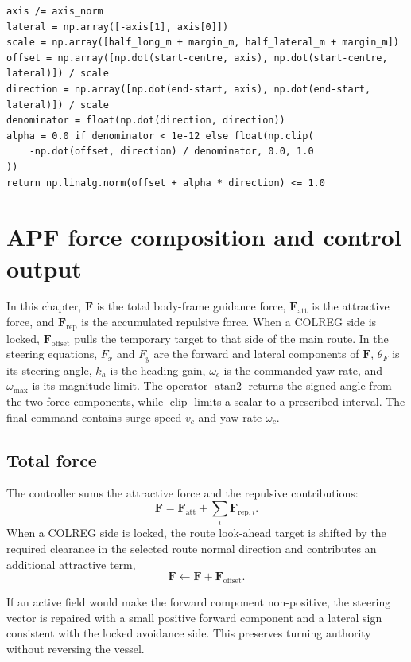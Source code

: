 \documentclass[11pt,a4paper]{article}
\begin{document}
\begin{lstlisting}
axis /= axis_norm
lateral = np.array([-axis[1], axis[0]])
scale = np.array([half_long_m + margin_m, half_lateral_m + margin_m])
offset = np.array([np.dot(start-centre, axis), np.dot(start-centre, lateral)]) / scale
direction = np.array([np.dot(end-start, axis), np.dot(end-start, lateral)]) / scale
denominator = float(np.dot(direction, direction))
alpha = 0.0 if denominator < 1e-12 else float(np.clip(
    -np.dot(offset, direction) / denominator, 0.0, 1.0
))
return np.linalg.norm(offset + alpha * direction) <= 1.0
\end{lstlisting}

\section{APF force composition and control output}

In this chapter, $\bm{F}$ is the total body-frame guidance force,
$\bm{F}_{\mathrm{att}}$ is the attractive force, and
$\bm{F}_{\mathrm{rep}}$ is the accumulated repulsive force. When a COLREG
side is locked, $\bm{F}_{\mathrm{offset}}$ pulls the temporary target to that
side of the main route. In the steering equations,
$F_x$ and $F_y$ are the forward and lateral components of $\bm{F}$,
$\theta_F$ is its steering angle, $k_h$ is the heading gain, $\omega_c$ is
the commanded yaw rate, and $\omega_{\max}$ is its magnitude limit. The
operator $\operatorname{atan2}$ returns the signed angle from the two force
components, while $\operatorname{clip}$ limits a scalar to a prescribed
interval. The final command contains surge speed $v_c$ and yaw rate
$\omega_c$.

\subsection{Total force}

The controller sums the attractive force and the repulsive contributions:
\begin{equation}
\bm{F}=\bm{F}_{\mathrm{att}}+\sum_i\bm{F}_{\mathrm{rep},i}.
\end{equation}
When a COLREG side is locked, the route look-ahead target is shifted by the
required clearance in the selected route normal direction and contributes an
additional attractive term,
\begin{equation}
\bm{F}\leftarrow\bm{F}+\bm{F}_{\mathrm{offset}}.
\end{equation}

If an active field would make the forward component non-positive, the steering
vector is repaired with a small positive forward component and a lateral sign
consistent with the locked avoidance side. This preserves turning authority
without reversing the vessel.
\end{document}
